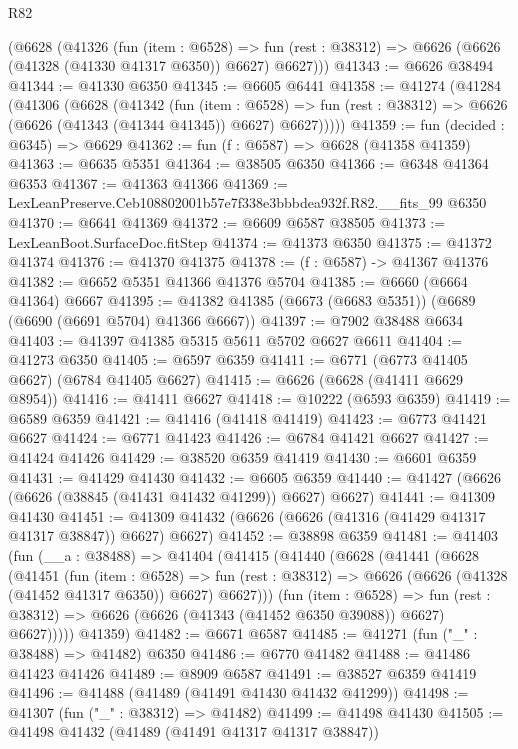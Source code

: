 \begin{lexlean}{R82}
\begin{coremodule}
    (@6628
      (@41326
        (fun (item : @6528) =>
        fun (rest : @38312) => @6626 (@6626 (@41328 (@41330 @41317 @6350)) @6627) @6627)))
@41343 := @6626 @38494
@41344 := @41330 @6350
@41345 := @6605 @6441
@41358 := @41274
    (@41284
      (@41306
        (@6628
          (@41342
            (fun (item : @6528) =>
            fun (rest : @38312) => @6626 (@6626 (@41343 (@41344 @41345)) @6627) @6627)))))
@41359 := fun (decided : @6345) => @6629
@41362 := fun (f : @6587) => @6628 (@41358 @41359)
@41363 := @6635 @5351
@41364 := @38505 @6350
@41366 := @6348 @41364 @6353
@41367 := @41363 @41366
@41369 := LexLeanPreserve.Ceb108802001b57e7f338e3bbbdea932f.R82.__fits_99 @6350
@41370 := @6641 @41369
@41372 := @6609 @6587 @38505
@41373 := LexLeanBoot.SurfaceDoc.fitStep
@41374 := @41373 @6350
@41375 := @41372 @41374
@41376 := @41370 @41375
@41378 := (f : @6587) -> @41367 @41376
@41382 := @6652 @5351 @41366 @41376 @5704
@41385 := @6660 (@6664 @41364) @6667
@41395 := @41382 @41385 (@6673 (@6683 @5351)) (@6689 (@6690 (@6691 @5704) @41366 @6667))
@41397 := @7902 @38488 @6634
@41403 := @41397 @41385 @5315 @5611 @5702 @6627 @6611
@41404 := @41273 @6350
@41405 := @6597 @6359
@41411 := @6771 (@6773 @41405 @6627) (@6784 @41405 @6627)
@41415 := @6626 (@6628 (@41411 @6629 @8954))
@41416 := @41411 @6627
@41418 := @10222 (@6593 @6359)
@41419 := @6589 @6359
@41421 := @41416 (@41418 @41419)
@41423 := @6773 @41421 @6627
@41424 := @6771 @41423
@41426 := @6784 @41421 @6627
@41427 := @41424 @41426
@41429 := @38520 @6359 @41419
@41430 := @6601 @6359
@41431 := @41429 @41430
@41432 := @6605 @6359
@41440 := @41427 (@6626 (@6626 (@38845 (@41431 @41432 @41299)) @6627) @6627)
@41441 := @41309 @41430
@41451 := @41309 @41432 (@6626 (@6626 (@41316 (@41429 @41317 @41317 @38847)) @6627) @6627)
@41452 := @38898 @6359
@41481 := @41403
    (fun (__a : @38488) =>
    @41404
      (@41415
        (@41440
          (@6628
            (@41441
              (@6628
                (@41451
                  (fun (item : @6528) =>
                  fun (rest : @38312) => @6626 (@6626 (@41328 (@41452 @41317 @6350)) @6627) @6627)))
              (fun (item : @6528) =>
              fun (rest : @38312) => @6626 (@6626 (@41343 (@41452 @6350 @39088)) @6627) @6627)))))
      @41359)
@41482 := @6671 @6587
@41485 := @41271 (fun ("_" : @38488) => @41482) @6350
@41486 := @6770 @41482
@41488 := @41486 @41423 @41426
@41489 := @8909 @6587
@41491 := @38527 @6359 @41419
@41496 := @41488 (@41489 (@41491 @41430 @41432 @41299))
@41498 := @41307 (fun ("_" : @38312) => @41482)
@41499 := @41498 @41430
@41505 := @41498 @41432 (@41489 (@41491 @41317 @41317 @38847))

\end{coremodule}
\end{lexlean}
